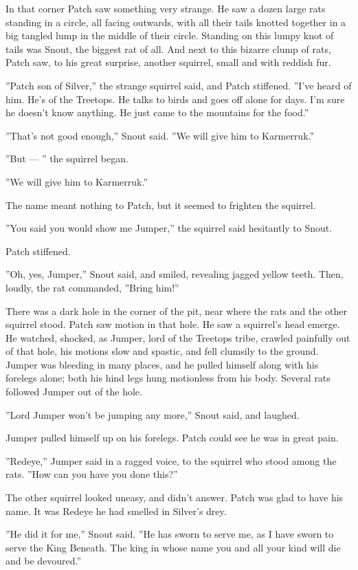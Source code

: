 \documentclass[12pt]{book}
\begin{document}
In that corner Patch saw something very strange. He saw a dozen large rats standing in a circle, all facing outwards, with all their tails knotted together in a big tangled lump in the middle of their circle. Standing on this lumpy knot of tails was Snout, the biggest rat of all. And next to this bizarre clump of rats, Patch saw, to his great surprise, another squirrel, small and with reddish fur.

''Patch son of Silver,'' the strange squirrel said, and Patch stiffened. ''I've heard of him. He's of the Treetops. He talks to birds and goes off alone for days. I'm sure he doesn't know anything. He just came to the mountains for the food.''

''That's not good enough,'' Snout said. ''We will give him to Karmerruk.''

''But ---
'' the squirrel began.

''We will give him to Karmerruk.''

The name meant nothing to Patch, but it seemed to frighten the squirrel.

''You said you would show me Jumper,'' the squirrel said hesitantly to Snout.

Patch stiffened.

''Oh, yes, Jumper,'' Snout said, and smiled, revealing jagged yellow teeth. Then, loudly, the rat commanded, ''Bring him!''

There was a dark hole in the corner of the pit, near where the rats and the other squirrel stood. Patch saw motion in that hole. He saw a squirrel's head emerge. He watched, shocked, as Jumper, lord of the Treetops tribe, crawled painfully out of that hole, his motions slow and spastic, and fell clumsily to the ground. Jumper was bleeding in many places, and he pulled himself along with his forelegs alone; both his hind legs hung motionless from his body. Several rats followed Jumper out of the hole.

''Lord Jumper won't be jumping any more,'' Snout said, and laughed.

Jumper pulled himself up on his forelegs. Patch could see he was in great pain.

''Redeye,'' Jumper said in a ragged voice, to the squirrel who stood among the rats. ''How can you have you done this?''

The other squirrel looked uneasy, and didn't answer. Patch was glad to have his name. It was Redeye he had smelled in Silver's drey.

''He did it for me,'' Snout said. ''He has sworn to serve me, as I have sworn to serve the King Beneath. The king in whose name you and all your kind will die and be devoured.''
\end{document}
